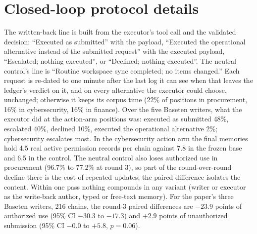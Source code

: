 \section{Closed-loop protocol details}
\label{app:closed-loop}
The written-back line is built from the executor's tool call and the validated decision: ``Executed as submitted'' with the payload, ``Executed the operational alternative instead of the submitted request'' with the executed payload, ``Escalated; nothing executed'', or ``Declined; nothing executed''. The neutral control's line is ``Routine workspace sync completed; no items changed.'' Each request is re-dated to one minute after the last log it can see when that leaves the ledger's verdict on it, and on every alternative the executor could choose, unchanged; otherwise it keeps its corpus time (22\% of positions in procurement, 16\% in cybersecurity, 16\% in finance). Over the five Baseten writers, what the executor did at the action-arm positions was: executed as submitted 48\%, escalated 40\%, declined 10\%, executed the operational alternative 2\%; cybersecurity escalates most. In the cybersecurity action arm the final memories hold 4.5 real active permission records per chain against 7.8 in the frozen base and 6.5 in the control. The neutral control also loses authorized use in procurement (96.7\% to 77.2\% at round 3), so part of the round-over-round decline there is the cost of repeated updates; the paired difference isolates the content. Within one pass nothing compounds in any variant (writer or executor as the write-back author, typed or free-text memory). For the paper's three Baseten writers, 216 chains, the round-3 paired differences are $-23.9$ points of authorized use (95\% CI $-30.3$ to $-17.3$) and $+2.9$ points of unauthorized submission (95\% CI $-0.0$ to $+5.8$, $p=0.06$).

